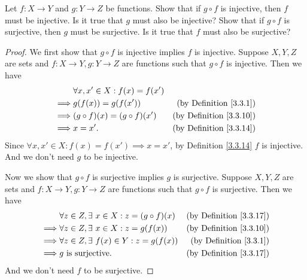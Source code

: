 \begin{exercise}\label{ex 3.3.5}
    Let \(f : X \to Y\) and \(g : Y \to Z\) be functions.
    Show that if \(g \circ f\) is injective, then \(f\) must be injective.
    Is it true that \(g\) must also be injective?
    Show that if \(g \circ f\) is surjective, then \(g\) must be surjective.
    Is it true that \(f\) must also be surjective?
\end{exercise}

\begin{proof}
    We first show that \(g \circ f\) is injective implies \(f\) is injective.
    Suppose \(X, Y, Z\) are sets and \(f : X \to Y, g : Y \to Z\) are functions such that \(g \circ f\) is injective.
    Then we have
    \begin{align*}
                 & \forall x, x' \in X : f(x) = f(x')                                       \\
        \implies & g(f(x)) = g(f(x'))                 & \text{(by Definition \ref{3.3.1})}  \\
        \implies & (g \circ f)(x) = (g \circ f)(x')   & \text{(by Definition \ref{3.3.10})} \\
        \implies & x = x'.                            & \text{(by Definition \ref{3.3.14})}
    \end{align*}
    Since \(\forall x, x' \in X : f(x) = f(x') \implies x = x'\), by Definition \ref{3.3.14} \(f\) is injective.
    And we don't need \(g\) to be injective.

    Now we show that \(g \circ f\) is surjective implies \(g\) is surjective.
    Suppose \(X, Y, Z\) are sets and \(f : X \to Y, g : Y \to Z\) are functions such that \(g \circ f\) is surjective.
    Then we have
    \begin{align*}
                 & \forall z \in Z, \exists\ x \in X : z = (g \circ f)(x) & \text{(by Definition \ref{3.3.17})} \\
        \implies & \forall z \in Z, \exists\ x \in X : z = g(f(x))        & \text{(by Definition \ref{3.3.10})} \\
        \implies & \forall z \in Z, \exists\ f(x) \in Y : z = g(f(x))     & \text{(by Definition \ref{3.3.1})}  \\
        \implies & g \text{ is surjective}.                               & \text{(by Definition \ref{3.3.17})}
    \end{align*}
    And we don't need \(f\) to be surjective.
\end{proof}

